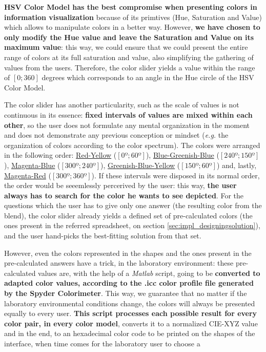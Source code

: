 \textbf{HSV Color Model has the best compromise when presenting colors in information visualization} because of its primtives (Hue, Saturation and Value)
which allows to manipulate colors in a better way. However, \textbf{we have chosen to only modify the Hue value and leave the Saturation and Value on its
maximum value}: this way, we could ensure that we could present the entire range of colors at its full saturation and value, also simplifying the gathering
of values from the users. Therefore, the color slider yields a value within the range of $[0 ; 360]$ degrees which corresponds to an angle in the Hue circle
of the HSV Color Model. \par
%
The color slider has another particularity, such as the scale of values is not continuous in its essence: \textbf{fixed intervals of values are
mixed within each other}, so the user does not formulate any mental organization in the moment and does not demonstrate any previous conception or mindset
(\emph{e.g.} the organization of colors according to the color spectrum). The colors were arranged in the following order: \ul{Red-Yellow} ($[0º; 60º]$),
\ul{Blue-Greenish-Blue} ($[240º; 150º]$), \ul{Magenta-Blue} ($[300º; 240º]$), \ul{Greenish-Blue-Yellow} ($[150º; 60º]$) and, lastly, \ul{Magenta-Red} ($[300º; 360º]$). If these
intervals were disposed in its normal order, the order would be seeemlessly percerived by the user: this way, \textbf{the user always has to search for the
color he wants to see depicted}. For the questions which the user has to give only one answer (the resulting color from the blend), the color slider
already yields a defined set of pre-calculated colors (the ones present in the referred spreadsheet, on section \ref{sec:impl_designingsolution}), and the
user hand-picks the best-fitting solution from that set. \par
%
However, even the colors represented in the shapes and the ones present in the pre-calculated answers have a trick, in the laboratory environment: these
pre-calculated values are, with the help of a \emph{Matlab} script, going to be \textbf{converted to adapted color values, according to the .icc color profile
file generated by the Spyder Colorimeter}. This way, we guarantee that no matter if the laboratory environmental conditions change, the colors will always be
presented equally to every user. \textbf{This script processes each possible result for every color pair, in every color model}, converts it to a normalized
CIE-XYZ value and in the end, to an hexadecimal color code to be printed on the shapes of the interface, when time comes for the laboratory user to choose a

